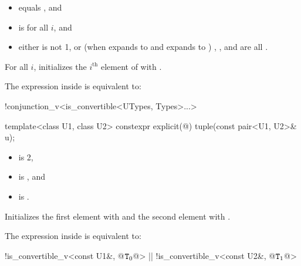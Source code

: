 \documentclass{wg21}
\begin{document}
\begin{itemdescr}
    \pnum
    \constraints
    \begin{itemize}
        \item
         equals , and

        \item
         is  for all $i$, and

        \item
        either
         is not 1, or
        (when  expands to  and  expands to )
        , ,
        and  are all .
    \end{itemize}

    \pnum
    \effects
    For all $i$,
    initializes the $i^\text{th}$ element of  with
    .

    \pnum
    \remarks
    The expression inside  is equivalent to:
    \begin{codeblock}
        !conjunction_v<is_convertible<UTypes, Types>...>
    \end{codeblock}
\end{itemdescr}

%
%
\begin{itemdecl}
template<class U1, class U2> constexpr explicit(@\seebelow@) tuple(const pair<U1, U2>& u);
\end{itemdecl}

\begin{itemdescr}
    \pnum
    \constraints
    \begin{itemize}
        \item {} is 2,
        \item {} is , and
        \item {} is .
    \end{itemize}

    \pnum
    \effects
    Initializes the first element with  and the
    second element with .

    \pnum
    The expression inside  is equivalent to:
    \begin{codeblock}
        !is_convertible_v<const U1&, @$\texttt{T}_0$@> || !is_convertible_v<const U2&, @$\texttt{T}_1$@>
    \end{codeblock}
\end{itemdescr}
\end{document}
